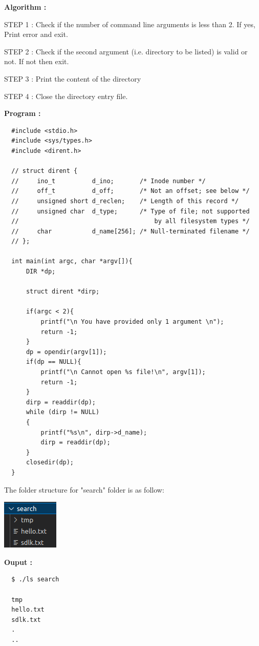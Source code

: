 \documentclass[journal,onecolumn]{IEEEtran}
\begin{document}
\textbf{Algorithm : }
\begin{list}{}{}
  \item STEP 1 : Check if the number of command line arguments is less than 2. If
  yes, Print error and exit.
  \item STEP 2 : Check if the second argument (i.e. directory to be listed) is valid or not. If not
  then exit.
  \item STEP 3 : Print the content of the directory
  \item STEP 4 : Close the directory entry file.
\end{list}

\textbf{Program : }
\begin{verbatim}
  #include <stdio.h>
  #include <sys/types.h>
  #include <dirent.h>
  
  // struct dirent {
  //     ino_t          d_ino;       /* Inode number */
  //     off_t          d_off;       /* Not an offset; see below */
  //     unsigned short d_reclen;    /* Length of this record */
  //     unsigned char  d_type;      /* Type of file; not supported
  //                                     by all filesystem types */
  //     char           d_name[256]; /* Null-terminated filename */
  // };
  
  int main(int argc, char *argv[]){
      DIR *dp;
  
      struct dirent *dirp;
  
      if(argc < 2){
          printf("\n You have provided only 1 argument \n");
          return -1;
      }
      dp = opendir(argv[1]);
      if(dp == NULL){
          printf("\n Cannot open %s file!\n", argv[1]);
          return -1;
      }
      dirp = readdir(dp);
      while (dirp != NULL)
      {
          printf("%s\n", dirp->d_name);
          dirp = readdir(dp);
      }
      closedir(dp);
  }
\end{verbatim}

The folder structure for "search" folder is as follow:
\newline

\includegraphics[scale=1.5]{search.png}


\textbf{Ouput :}
\begin{verbatim}
  $ ./ls search

  tmp
  hello.txt
  sdlk.txt
  .
  ..
\end{verbatim}
\end{document}

